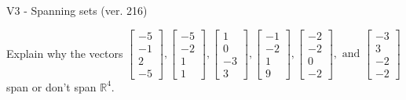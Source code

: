 \begin{exercise}
  \begin{exerciseTitle}V3 - Spanning sets (ver. 216)\end{exerciseTitle}
  \begin{exerciseStatement}
    Explain why the vectors \(\left[\begin{array}{r}
-5 \\
-1 \\
2 \\
-5
\end{array}\right] , \left[\begin{array}{r}
-5 \\
-2 \\
1 \\
1
\end{array}\right] , \left[\begin{array}{r}
1 \\
0 \\
-3 \\
3
\end{array}\right] , \left[\begin{array}{r}
-1 \\
-2 \\
1 \\
9
\end{array}\right] , \left[\begin{array}{r}
-2 \\
-2 \\
0 \\
-2
\end{array}\right] , \text{ and } \left[\begin{array}{r}
-3 \\
3 \\
-2 \\
-2
\end{array}\right]\) span or don't span \(\mathbb{R}^4\). 
	



\end{exerciseStatement}
\end{exercise}
